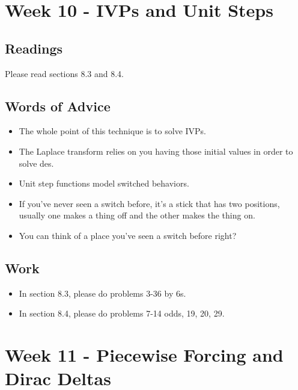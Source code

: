 	\clearpage



	\section{Week 10 - IVPs and Unit Steps}

	\subsection{Readings}
		Please read sections 8.3 and 8.4.

	\subsection{Words of Advice}
		\begin{itemize}
			\item The whole point of this technique is to solve IVPs.
			\item The Laplace transform relies on you having those initial values in order to solve des.
			\item Unit step functions model switched behaviors.
			\item If you've never seen a switch before, it's a stick that has two positions, usually one makes a thing off and the other makes the thing on.
			\item You can think of a place you've seen a switch before right?
		\end{itemize}

	\subsection{Work}
		\begin{itemize}
			\item In section 8.3, please do problems 3-36 by 6s.
			\item In section 8.4, please do problems 7-14 odds, 19, 20, 29.
		\end{itemize}

	\clearpage



	\section{Week 11 - Piecewise Forcing and Dirac Deltas}

